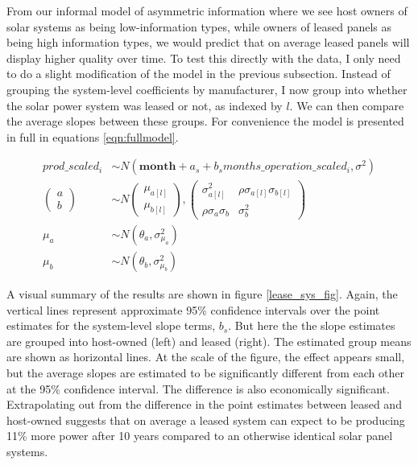 \documentclass[12pt]{article}
\begin{document}
From our informal model of asymmetric information where we see host owners of solar systems as being low-information types, while owners of leased panels as being high information types, we would predict that on average leased panels will display higher quality over time. To test this directly with the data, I only need to do a slight modification of the model in the previous subsection. Instead of grouping the system-level coefficients by manufacturer, I now group into whether the solar power system was leased or not, as indexed by $l$. We can then compare the average slopes between these groups. For convenience the model is presented in full in equations \ref{eqn:fullmodel}.

\begin{equation}
\begin{aligned}
prod\_scaled_{i} &\sim N(\mathbf{month} + a_s + b_s months\_operation\_scaled_{i}, \sigma^2)\\
\begin{pmatrix}
  a\\
  b
\end{pmatrix}
&\sim N
\begin{pmatrix}
  \mu_{a[l]}\\
  \mu_{b[l]}
\end{pmatrix},
\begin{pmatrix}
  \sigma_{a[l]}^2 & \rho \sigma_{a[l]} \sigma_{b[l]} \\
  \rho \sigma_a \sigma_b & \sigma_b^2
\end{pmatrix} \\
\mu_{a} &\sim N(\theta_a, \sigma_{\mu_a}^2) \\
\mu_{b} & \sim N(\theta_b, \sigma_{\mu_b}^2) \label{eqn:fullmodel}
\end{aligned}
\end{equation}

A visual summary of the results are shown in figure \ref{lease_sys_fig}. Again, the vertical lines represent approximate 95\% confidence intervals over the point estimates for the system-level slope terms, $b_s$. But here the the slope estimates are grouped into host-owned (left) and leased (right). The estimated group means are shown as horizontal lines. At the scale of the figure, the effect appears small, but the average slopes are estimated to be significantly different from each other at the 95\% confidence interval. The difference is also economically significant. Extrapolating out from the difference in the point estimates between leased and host-owned suggests that on average a leased system can expect to be producing 11\% more power after 10 years compared to an otherwise identical solar panel systems.
\end{document}
